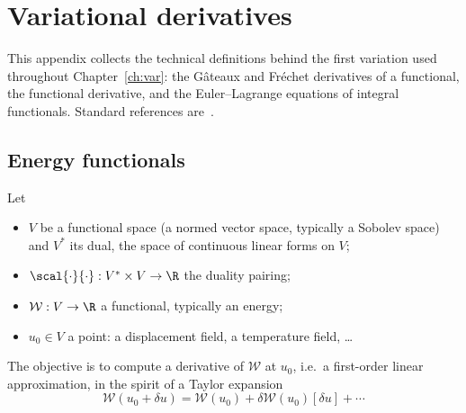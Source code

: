 \chapter{Variational derivatives}\label{app:derivatives}

This appendix collects the technical definitions behind the first variation
used throughout Chapter~\ref{ch:var}: the G\^ateaux and Fr\'echet derivatives
of a functional, the functional derivative, and the Euler--Lagrange equations
of integral functionals. Standard references are~\cite{GelfandFomin,DacorognaIntro}.

\section{Energy functionals}
Let
\begin{itemize}
  \item $V$ be a functional space (a normed vector space, typically a Sobolev
  space) and $V^\ast$ its dual, the space of continuous linear forms on $V$;
  \item $\scal{\cdot}{\cdot}:V^\ast\times V\to\R$ the duality pairing;
  \item $\mathcal W:V\to\R$ a functional, typically an energy;
  \item $u_0\in V$ a point: a displacement field, a temperature field, \dots
\end{itemize}
The objective is to compute a derivative of $\mathcal W$ at $u_0$, i.e.\ a
first-order linear approximation, in the spirit of a Taylor expansion
\[
  \mathcal W(u_0+\delta u)=\mathcal W(u_0)+\delta\mathcal W(u_0)[\delta u]+\cdots
\]

